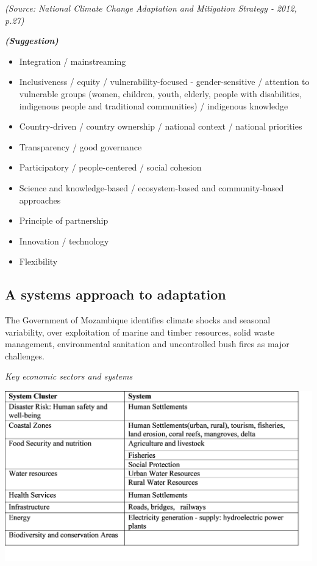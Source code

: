 \documentclass[
]{book}
\providecommand{\tightlist}{%
  \setlength{\itemsep}{0pt}\setlength{\parskip}{0pt}}
\begin{document}
\emph{(Source: National Climate Change Adaptation and Mitigation Strategy - 2012, p.27)}

\textbf{\emph{(Suggestion)}}

\begin{itemize}
\tightlist
\item
  Integration / mainstreaming
\item
  Inclusiveness / equity / vulnerability-focused - gender-sensitive / attention to vulnerable groups (women, children, youth, elderly, people with disabilities, indigenous people and traditional communities) / indigenous knowledge
\item
  Country-driven / country ownership / national context / national priorities
\item
  Transparency / good governance
\item
  Participatory / people-centered / social cohesion
\item
  Science and knowledge-based / ecosystem-based and community-based approaches
\item
  Principle of partnership
\item
  Innovation / technology
\item
  Flexibility
\end{itemize}

\hypertarget{a-systems-approach-to-adaptation}{%
\subsection{A systems approach to adaptation}\label{a-systems-approach-to-adaptation}}

The Government of Mozambique identifies climate shocks and seasonal variability, over exploitation of marine and timber resources, solid waste management, environmental sanitation and uncontrolled bush fires as major challenges.

\emph{Key economic sectors and systems}

\includegraphics{Figure20.png}
\end{document}
